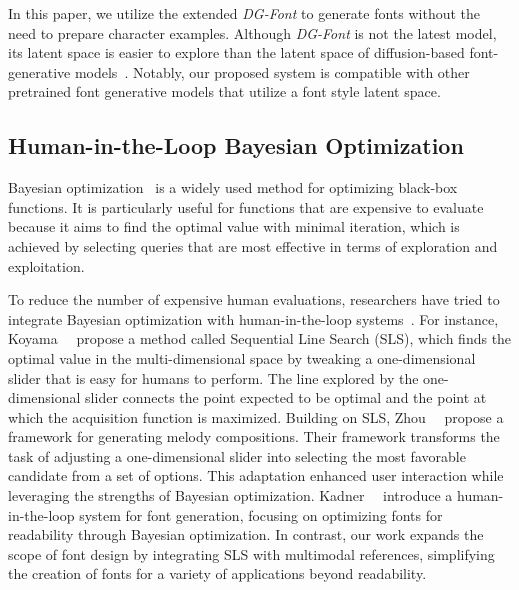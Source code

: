In this paper, we utilize the extended \textit{DG-Font} to generate fonts without the need to prepare character examples.
Although \textit{DG-Font} is not the latest model, its latent space is easier to explore than the latent space of diffusion-based font-generative models~\cite{liu2024qtfont, yang2024fontdiffuser, he2024difffont}.
Notably, our proposed system is compatible with other pretrained font generative models that utilize a font style latent space.

\subsection{Human-in-the-Loop Bayesian Optimization}
Bayesian optimization~\cite{Brochu2010B, ShahriaiReviewBO2016} is a widely used method for optimizing black-box functions.
It is particularly useful for functions that are expensive to evaluate because it aims to find the optimal value with minimal iteration, which is achieved by selecting queries that are most effective in terms of exploration and exploitation.

To reduce the number of expensive human evaluations, researchers have tried to integrate Bayesian optimization with human-in-the-loop systems~\cite{Brochu2010A, Brochu2007, KoyamaGallery2020, KoyamaSequential2017, ZhouGenerativeMelody2020, kadner2021adaptifont,Mo2024, chong2021interactive}.
For instance, Koyama~\etal\ \cite{KoyamaSequential2017} propose a method called Sequential Line Search (SLS), which finds the optimal value in the multi-dimensional space by tweaking a one-dimensional slider that is easy for humans to perform.
The line explored by the one-dimensional slider connects the point expected to be optimal and the point at which the acquisition function is maximized.
Building on SLS, Zhou~\etal~\cite{ZhouGenerativeMelody2020} propose a framework for generating melody compositions.
Their framework transforms the task of adjusting a one-dimensional slider into selecting the most favorable candidate from a set of options.
This adaptation enhanced user interaction while leveraging the strengths of Bayesian optimization.
Kadner~\etal~\cite{kadner2021adaptifont} introduce a human-in-the-loop system for font generation, focusing on optimizing fonts for readability through Bayesian optimization.
In contrast, our work expands the scope of font design by integrating SLS with multimodal references, simplifying the creation of fonts for a variety of applications beyond readability.

